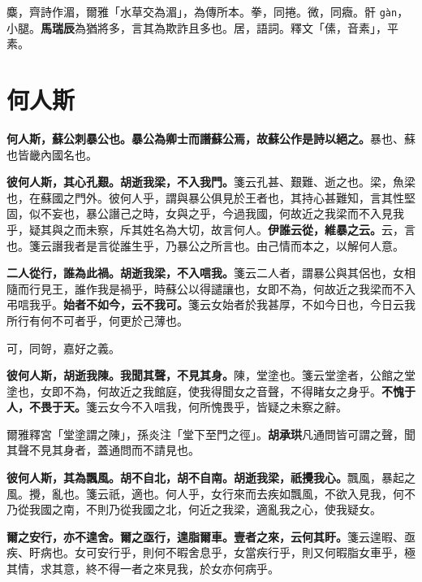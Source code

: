 \begin{quoting}麋，齊詩作湄，爾雅「水草交為湄」，為傳所本。拳，同捲。微，同癓。骭 \texttt{gàn}，小腿。\textbf{馬瑞辰}為猶將多，言其為欺詐且多也。居，語詞。釋文「傃，音素」，平素。\end{quoting}

\section{何人斯}


\textbf{何人斯，蘇公刺暴公也。暴公為卿士而譖蘇公焉，故蘇公作是詩以絕之。}{\footnotesize 暴也、蘇也皆畿內國名也。}

\textbf{彼何人斯，其心孔艱。胡逝我梁，不入我門。}{\footnotesize 箋云孔甚、艱難、逝之也。梁，魚梁也，在蘇國之門外。彼何人乎，謂與暴公俱見於王者也，其持心甚難知，言其性堅固，似不妄也，暴公譖己之時，女與之乎，今過我國，何故近之我梁而不入見我乎，疑其與之而未察，斥其姓名為大切，故言何人。}\textbf{伊誰云從，維暴之云。}{\footnotesize 云，言也。箋云譖我者是言從誰生乎，乃暴公之所言也。由己情而本之，以解何人意。}

\textbf{二人從行，誰為此禍。胡逝我梁，不入唁我。}{\footnotesize 箋云二人者，謂暴公與其侶也，女相隨而行見王，誰作我是禍乎，時蘇公以得譴讓也，女即不為，何故近之我梁而不入弔唁我乎。}\textbf{始者不如今，云不我可。}{\footnotesize 箋云女始者於我甚厚，不如今日也，今日云我所行有何不可者乎，何更於己薄也。}

\begin{quoting}可，同哿，嘉好之義。\end{quoting}

\textbf{彼何人斯，胡逝我陳。我聞其聲，不見其身。}{\footnotesize 陳，堂塗也。箋云堂塗者，公館之堂塗也，女即不為，何故近之我館庭，使我得聞女之音聲，不得睹女之身乎。}\textbf{不愧于人，不畏于天。}{\footnotesize 箋云女今不入唁我，何所愧畏乎，皆疑之未察之辭。}

\begin{quoting}爾雅釋宮「堂塗謂之陳」，孫炎注「堂下至門之徑」。\textbf{胡承珙}凡通問皆可謂之聲，聞其聲不見其身者，蓋通問而不請見也。\end{quoting}

\textbf{彼何人斯，其為飄風。胡不自北，胡不自南。胡逝我梁，祇攪我心。}{\footnotesize 飄風，暴起之風。攪，亂也。箋云祇，適也。何人乎，女行來而去疾如飄風，不欲入見我，何不乃從我國之南，不則乃從我國之北，何近之我梁，適亂我之心，使我疑女。}

\textbf{爾之安行，亦不遑舍。爾之亟行，遑脂爾車。壹者之來，云何其盱。}{\footnotesize 箋云遑暇、亟疾、盱病也。女可安行乎，則何不暇舍息乎，女當疾行乎，則又何暇脂女車乎，極其情，求其意，終不得一者之來見我，於女亦何病乎。}

